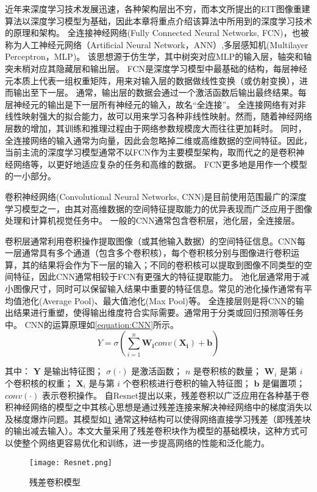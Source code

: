 近年来深度学习技术发展迅速，各种架构层出不穷，而本文所提出的EIT图像重建算法以深度学习模型为基础，因此本章将重点介绍该算法中所用到的深度学习技术的原理和架构。
全连接神经网络(Fully Connected Neural Networks, FCN)，也被称为人工神经元网络（Artificial Neural Network，ANN）,多层感知机(Multilayer Perceptron，MLP)。
该思想源于仿生学，其中树突对应MLP的输入层，轴突和轴突未梢对应其隐藏层和输出层。
FCN是深度学习模型中最基础的结构，每层神经元本质上代表一组权重矩阵，用来对输入层的数据做线性变换（或仿射变换），进而输出至下一层。
通常，输出层的数据会通过一个激活函数后输出最终结果。每层神经元的输出是下一层所有神经元的输入，故名“全连接”。
全连接网络有对非线性映射强大的拟合能力，故可以用来学习各种非线性映射。然而，随着神经网络层数的增加，其训练和推理过程由于网络参数规模庞大而往往更加耗时。
同时，全连接网络的输入通常为向量，因此会忽略掉二维或高维数据的空间特征。因此，当前主流的深度学习模型通常不以FCN作为主要模型架构，取而代之的是卷积神经网络等，以更好地适应复杂的任务和高维的数据。
FCN更多地是用作一个模型的一小部分。


卷积神经网络(Convolutional Neural Networks, CNN)是目前使用范围最广的深度学习模型之一，由其对高维数据的空间特征提取能力的优异表现而广泛应用于图像处理和计算机视觉任务中。
一般的CNN通常包含卷积层，池化层，全连接层。


卷积层通常利用卷积操作提取图像（或其他输入数据）的空间特征信息。CNN每一层通常具有多个通道（包含多个卷积核），每个卷积核分别与图像进行卷积运算，其的结果将会作为下一层的输入；不同的卷积核可以提取到图像不同类型的空间特征，因此CNN通常相较于FCN有更强大的特征提取能力。
池化层通常用于减小图像尺寸，同时可以保留输入结果中重要的特征信息。常见的池化操作通常有平均值池化(Average Pool)、最大值池化(Max Pool)等。
全连接层则是将CNN的输出结果进行重塑，使得输出维度符合实际需要。通常用于分类或回归预测等任务中。
CNN的运算原理如\cref{equation:CNN}所示。
\begin{equation}
  \label{equation:CNN}
  Y = \sigma\left(\sum_{i=1}^{n} \boldsymbol{W_i} conv(\boldsymbol{X_i}) + \boldsymbol{b}\right)
\end{equation}

其中：
$\mathbf{Y}$ 是输出特征图；
$\sigma(\cdot)$ 是激活函数；
$n$ 是卷积核的数量；
$\mathbf{W}_i$ 是第 $i$ 个卷积核的权重；
$\mathbf{X}_i$ 是与第 $i$ 个卷积核进行卷积的输入特征图；
$\mathbf{b}$ 是偏置项；
$conv(\cdot)$ 表示卷积操作。
自Resnet提出以来\cite{2016Resnet}，残差卷积以广泛应用在各种基于卷积神经网络的模型之中其核心思想是通过残差连接来解决神经网络中的梯度消失以及梯度爆炸问题。其模型如\cref{figure:Resnet}
通常这种结构可以使得网络直接学习残差（即残差块的输出减去输入）。本文大量采用了残差卷积块作为模型的基础模块，这种方式可以使整个网络更容易优化和训练，进一步提高网络的性能和泛化能力。
\begin{figure}[h]
  \centering
  \texttt{[image: Resnet.png]}
  \caption{残差卷积模型}
  \label{figure:Resnet}
\end{figure}



